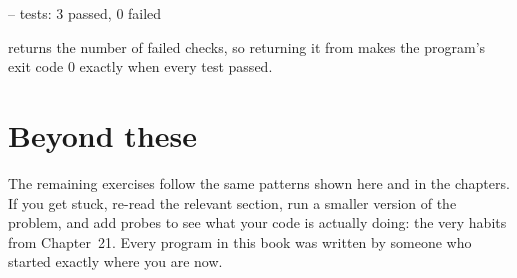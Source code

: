 \begin{progout}
--
tests: 3 passed, 0 failed
\end{progout}

 returns the number of failed checks, so returning it from
 makes the program's exit code 0 exactly when every test passed.

\section*{Beyond these}

The remaining exercises follow the same patterns shown here and in the chapters.
If you get stuck, re-read the relevant section, run a smaller version of the
problem, and add  probes to see what your code is actually doing:
the very habits from Chapter~21. Every program in this book was written by someone
who started exactly where you are now.
